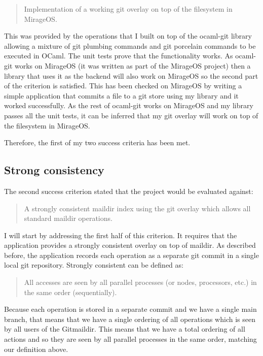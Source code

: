 \begin{quote}
  Implementation of a working git overlay on top of the filesystem in MirageOS.
\end{quote}

This was provided by the operations that I built on top of the ocaml-git library allowing a mixture of git plumbing commands and git porcelain commands to be executed in OCaml. The unit tests prove that the functionality works. As ocaml-git works on MirageOS (it was written as part of the MirageOS project) then a library that uses it as the backend will also work on MirageOS so the second part of the criterion is satisfied. This has been checked on MirageOS by writing a simple application that commits a file to a git store using my library and it worked successfully. As the rest of ocaml-git works on MirageOS and my library passes all the unit tests, it can be inferred that my git overlay will work on top of the filesystem in MirageOS.

Therefore, the first of my two success criteria has been met.

\subsection{Strong consistency}

The second success criterion stated that the project would be evaluated against:

\begin{quote}
  A strongly consistent maildir index using the git overlay which allows all standard maildir operations.
\end{quote}

I will start by addressing the first half of this criterion. It requires that the application provides a strongly consistent overlay on top of maildir. As described before, the application records each operation as a separate git commit in a single local git repository. Strongly consistent can be defined as:
\begin{quote}
  All accesses are seen by all parallel processes (or nodes, processors, etc.) in the same order (sequentially).
\end{quote}
Because each operation is stored in a separate commit and we have a single main branch, that means that we have a single ordering of all operations which is seen by all users of the Gitmaildir. This means that we have a total ordering of all actions and so they are seen by all parallel processes in the same order, matching our definition above.

